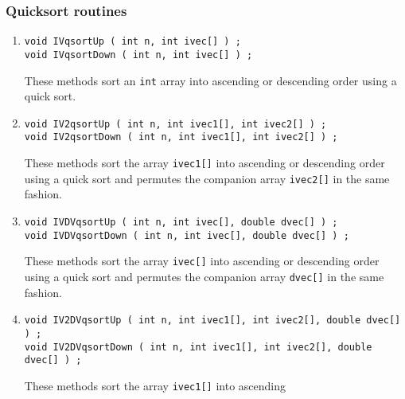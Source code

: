 \subsubsection{Quicksort routines}
\label{subsubsection:Utilities:proto:sort:quicksort}
\par
\begin{enumerate}
\item
\begin{verbatim}
void IVqsortUp ( int n, int ivec[] ) ;
void IVqsortDown ( int n, int ivec[] ) ;
\end{verbatim}
These methods sort an {\tt int} array into ascending or descending
order using a quick sort.
\item
\begin{verbatim}
void IV2qsortUp ( int n, int ivec1[], int ivec2[] ) ;
void IV2qsortDown ( int n, int ivec1[], int ivec2[] ) ;
\end{verbatim}
These methods sort the array {\tt ivec1[]} into ascending or
descending order using a quick sort and permutes 
the companion array {\tt ivec2[]} in the same fashion.
\item
\begin{verbatim}
void IVDVqsortUp ( int n, int ivec[], double dvec[] ) ;
void IVDVqsortDown ( int n, int ivec[], double dvec[] ) ;
\end{verbatim}
These methods sort the array {\tt ivec[]} into ascending or
descending order using a quick sort and permutes 
the companion array {\tt dvec[]} in the same fashion.
\item
\begin{verbatim}
void IV2DVqsortUp ( int n, int ivec1[], int ivec2[], double dvec[] ) ;
void IV2DVqsortDown ( int n, int ivec1[], int ivec2[], double dvec[] ) ;
\end{verbatim}
These methods sort the array {\tt ivec1[]} into ascending 

\end{enumerate}
